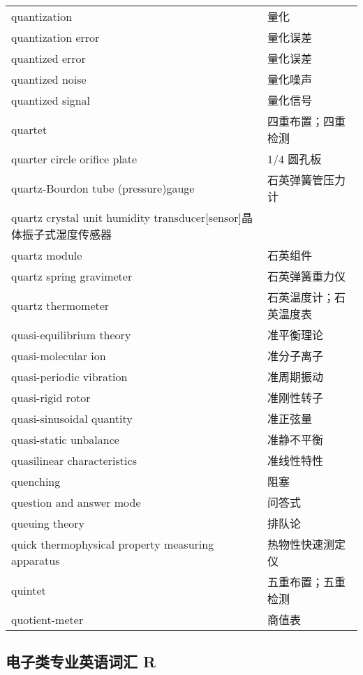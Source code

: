 \documentclass[
]{article}
\begin{document}
\begin{longtable}[]{@{}ll@{}}
quantization & 量化 \\
quantization error & 量化误差 \\
quantized error & 量化误差 \\
quantized noise & 量化噪声 \\
quantized signal & 量化信号 \\
quartet & 四重布置；四重检测 \\
quarter circle orifice plate & 1/4 圆孔板 \\
quartz-Bourdon tube (pressure)gauge & 石英弹簧管压力计 \\
quartz crystal unit humidity transducer{[}sensor{]}晶体振子式湿度传感器
& \\
quartz module & 石英组件 \\
quartz spring gravimeter & 石英弹簧重力仪 \\
quartz thermometer & 石英温度计；石英温度表 \\
quasi-equilibrium theory & 准平衡理论 \\
quasi-molecular ion & 准分子离子 \\
quasi-periodic vibration & 准周期振动 \\
quasi-rigid rotor & 准刚性转子 \\
quasi-sinusoidal quantity & 准正弦量 \\
quasi-static unbalance & 准静不平衡 \\
quasilinear characteristics & 准线性特性 \\
quenching & 阻塞 \\
question and answer mode & 问答式 \\
queuing theory & 排队论 \\
quick thermophysical property measuring apparatus & 热物性快速测定仪 \\
quintet & 五重布置；五重检测 \\
quotient-meter & 商值表 \\
\bottomrule()
\end{longtable}

\hypertarget{ux7535ux5b50ux7c7bux4e13ux4e1aux82f1ux8bedux8bcdux6c47-r}{%
\subsection{\texorpdfstring{电子类专业英语词汇 R
}{电子类专业英语词汇 R }}\label{ux7535ux5b50ux7c7bux4e13ux4e1aux82f1ux8bedux8bcdux6c47-r}}
\end{document}
